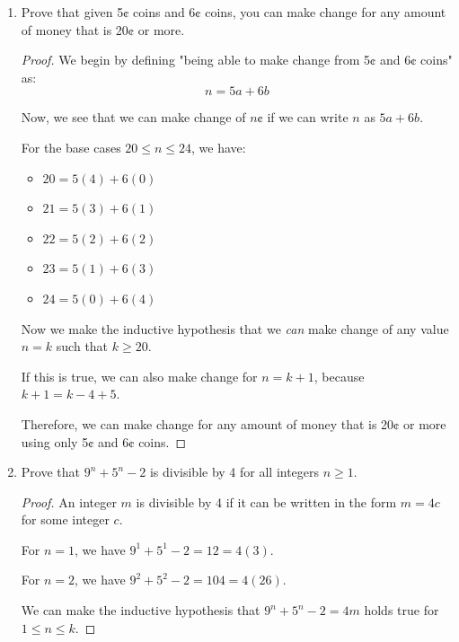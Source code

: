 \documentclass{article}
\begin{document}
\begin{enumerate}
    \item {
        Prove that given 5¢ coins and 6¢ coins, you can make change for any 
        amount of money that is 20¢ or more.

        \begin{proof}
            We begin by defining "being able to make change from 5¢ and 6¢ coins"
            as:
            \[n = 5a + 6b\]
            
            Now, we see that we can make change of \(n\)¢ if we can write \(n\)
            as \(5a + 6b\). 

            For the base cases \(20 \le n \le 24\), we have:
            \begin{itemize}
                \item \(20 = 5(4) + 6(0)\)
                \item \(21 = 5(3) + 6(1)\) 
                \item \(22 = 5(2) + 6(2)\) 
                \item \(23 = 5(1) + 6(3)\) 
                \item \(24 = 5(0) + 6(4)\)  
            \end{itemize}

            Now we make the inductive hypothesis that we \textit{can} make 
            change of any value \(n = k\) such that \(k \ge 20\).

            If this is true, we can also make change for \(n = k + 1\), because 
            \(k + 1 = k - 4 + 5\).

            Therefore, we can make change for any amount of money that is 20¢ or 
            more using only 5¢ and 6¢ coins.
        \end{proof}
    }

    \item {
        Prove that \(9^n + 5^n - 2\) is divisible by 4 for all integers \(n \ge 1\). 

        \begin{proof}
            An integer \(m\) is divisible by 4 if it can be written in the form 
            \(m = 4c\) for some integer \(c\).

            For \(n=1\), we have \(9^1 + 5^1 - 2 = 12 = 4(3)\).

            For \(n=2\), we have \(9^2 + 5^2 - 2 = 104 = 4(26)\).

            We can make the inductive hypothesis that \(9^n + 5^n - 2 = 4m\)
            holds true for \(1 \le n \le k\).


\end{proof}}
\end{enumerate}
\end{document}
